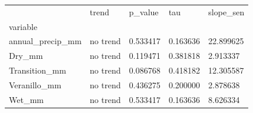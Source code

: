 \begin{tabular}{lllll}
\toprule
 & trend & p\_value & tau & slope\_sen \\
variable &  &  &  &  \\
\midrule
annual\_precip\_mm & no trend & 0.533417 & 0.163636 & 22.899625 \\
Dry\_mm & no trend & 0.119471 & 0.381818 & 2.913337 \\
Transition\_mm & no trend & 0.086768 & 0.418182 & 12.305587 \\
Veranillo\_mm & no trend & 0.436275 & 0.200000 & 2.878638 \\
Wet\_mm & no trend & 0.533417 & 0.163636 & 8.626334 \\
\bottomrule
\end{tabular}
